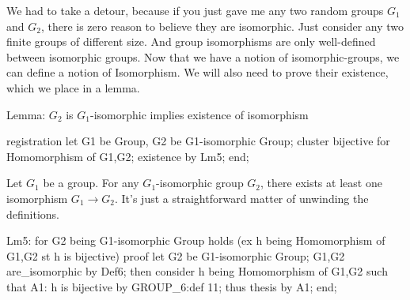 \nwendcode{}\nwdocspar

We had to take a detour, because if you just gave me any two random
groups $G_{1}$ and $G_{2}$, there is zero reason to believe they are
isomorphic. Just consider any two finite groups of different size. And
group isomorphisms are only well-defined between isomorphic groups. Now
that we have a notion of isomorphic-groups, we can define a notion of
{\Tt{}Isomorphism\nwendquote}. We will also need to prove their existence, which we
place in a lemma.

\nwenddocs{}\endmoddef\nwstartdeflinemarkup{}\nwenddeflinemarkup
\LA{}Lemma: $G_{2}$ is $G_{1}$-isomorphic implies existence of isomorphism~{\nwtagstyle{}}\RA{}

registration
  let G1 be Group,
      G2 be G1-isomorphic Group;
  cluster bijective for Homomorphism of G1,G2;
  existence by Lm5;
end;

\nwendcode{}\nwdocspar

Let $G_{1}$ be a group. For any $G_{1}$-isomorphic group $G_{2}$,
there exists at least one isomorphism $G_{1}\to G_{2}$. It's just a
straightforward matter of unwinding the definitions.

\nwenddocs{}\endmoddef\nwstartdeflinemarkup{}\nwenddeflinemarkup
Lm5:
  for G2 being G1-isomorphic Group
  holds (ex h being Homomorphism of G1,G2 st h is bijective)
proof
  let G2 be G1-isomorphic Group;
  G1,G2 are_isomorphic by Def6;
  then consider h being Homomorphism of G1,G2 such that
A1: h is bijective by GROUP_6:def 11;
  thus thesis by A1;
end;

\nwendcode{}\nwdocspar

